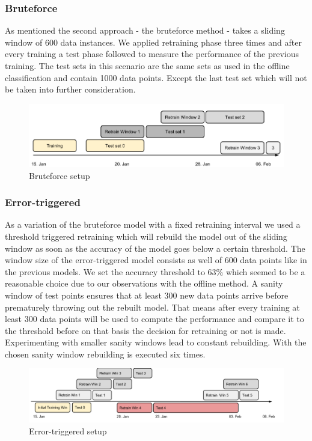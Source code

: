 \documentclass{article} %
\begin{document}
\subsubsection*{Bruteforce}
As mentioned the second approach - the bruteforce method -  takes a sliding window of 600 data instances. We applied retraining phase three times and after every training a test phase followed to measure the performance of the previous training.  The test sets in this scenario are the same sets as used in the offline classification and contain 1000 data points. Except the last test set which will not be taken into further consideration.
\begin{figure}[htbp]
  \centering
  \includegraphics[scale=0.28]{./time_models/BruteforceModel.png}
  \caption{Bruteforce setup}
\end{figure}
\subsubsection*{Error-triggered}
As a variation of the bruteforce model with a fixed retraining  interval we used a threshold triggered retraining which  will rebuild the model out of the sliding window as soon as the accuracy of the model goes below a certain threshold. The window size of
the error-triggered model consists as well of 600 data points like in the previous models. We set the accuracy threshold to 63\% which seemed to be a reasonable choice due to our observations with the offline method. A sanity window of test points ensures that at least 300 new data points arrive before prematurely throwing out the rebuilt model. That means after every training at least 300 data points will be used to compute the performance and compare it to the threshold before on that basis the decision for retraining or not is made. Experimenting with smaller sanity windows lead to constant rebuilding. With the chosen sanity window rebuilding is executed six times.
\begin{figure}[htbp]
  \centering
  \includegraphics[scale=0.25]{./time_models/Errortriggered.png}
  \caption{Error-triggered setup}
\end{figure}
\end{document}
